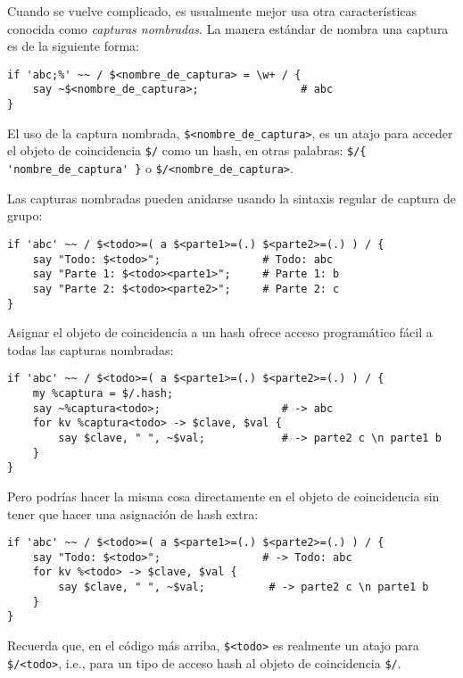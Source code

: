 Cuando se vuelve complicado, es usualmente mejor usa
otra características conocida como \emph{capturas nombradas}.
La manera estándar de nombra una captura es de la siguiente forma:

\begin{lstlisting}
if 'abc;%' ~~ / $<nombre_de_captura> = \w+ / {
    say ~$<nombre_de_captura>;                # abc
}
\end{lstlisting} 

El uso de la captura nombrada, \verb|$<nombre_de_captura>|,
es un atajo para acceder el objeto de coincidencia \verb|$/|
como un hash, en otras palabras: \verb|$/{ 'nombre_de_captura' }|
o \verb|$/<nombre_de_captura>|.

Las capturas nombradas pueden anidarse usando la sintaxis regular
de captura de grupo:

\begin{lstlisting}
if 'abc' ~~ / $<todo>=( a $<parte1>=(.) $<parte2>=(.) ) / {
    say "Todo: $<todo>";                # Todo: abc
    say "Parte 1: $<todo><parte1>";     # Parte 1: b
    say "Parte 2: $<todo><parte2>";     # Parte 2: c
}
\end{lstlisting} 

Asignar el objeto de coincidencia a un hash ofrece acceso programático 
fácil a todas las capturas nombradas:

\begin{lstlisting}
if 'abc' ~~ / $<todo>=( a $<parte1>=(.) $<parte2>=(.) ) / {
    my %captura = $/.hash;    
    say ~%captura<todo>;                   # -> abc
    for kv %captura<todo> -> $clave, $val {
        say $clave, " ", ~$val;            # -> parte2 c \n parte1 b
    }
}
\end{lstlisting} 

Pero podrías hacer la misma cosa directamente en el objeto de
coincidencia sin tener que hacer una asignación de hash extra:

\begin{lstlisting}
if 'abc' ~~ / $<todo>=( a $<parte1>=(.) $<parte2>=(.) ) / {
    say "Todo: $<todo>";                # -> Todo: abc
    for kv %<todo> -> $clave, $val {
        say $clave, " ", ~$val;          # -> parte2 c \n parte1 b
    }
}
\end{lstlisting}

Recuerda que, en el código más arriba, \verb|$<todo>| es
realmente un atajo para \verb|$/<todo>|, i.e., para un
tipo de acceso hash al objeto de coincidencia \verb|$/|.

